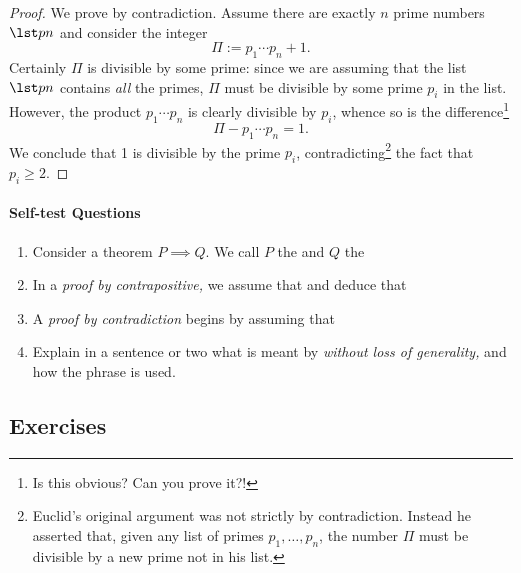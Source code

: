 \begin{proof}
We prove by contradiction. Assume there are exactly $n$ prime numbers $\lst p n$ and consider the integer
\[\Pi:=p_1\cdots p_n+1.\]
Certainly $\Pi$ is divisible by some prime: since we are assuming that the list $\lst pn$ contains \emph{all} the primes, $\Pi$ must be divisible by some prime $p_i$ in the list. However, the product $p_1\cdots p_n$ is clearly divisible by $p_i$, whence so is the difference\footnote{Is this obvious? Can you prove it?!}
\[\Pi-p_1\cdots p_n=1.\]
We conclude that 1 is divisible by the prime $p_i$, contradicting\footnote{Euclid's original argument was not strictly by contradiction. Instead he asserted that, given any list of primes $p_1,\ldots,p_n$, the number $\Pi$ must be divisible by a new prime not in his list.} the fact that $p_i\ge 2$.
\end{proof}

\paragraph{Self-test Questions}

\begin{enumerate}
  \item Consider a theorem $P\implies Q$. We call $P$ the \underline{\phantom{hypothesis}\qquad\qquad} and $Q$ the \underline{\phantom{conclusion}\qquad\qquad}
  \item In a \emph{proof by contrapositive,} we assume that \underline{\phantom{$Q$ is false}\qquad\qquad} and deduce that \underline{\phantom{$P$ is false}\qquad\qquad}
  \item A \emph{proof by contradiction} begins by assuming that \underline{\phantom{$P$ is true and $Q$ is false}\qquad\qquad}
  \item Explain in a sentence or two what is meant by \emph{without loss of generality,} and how the phrase is used.
\end{enumerate}

\subsection*{Exercises}


